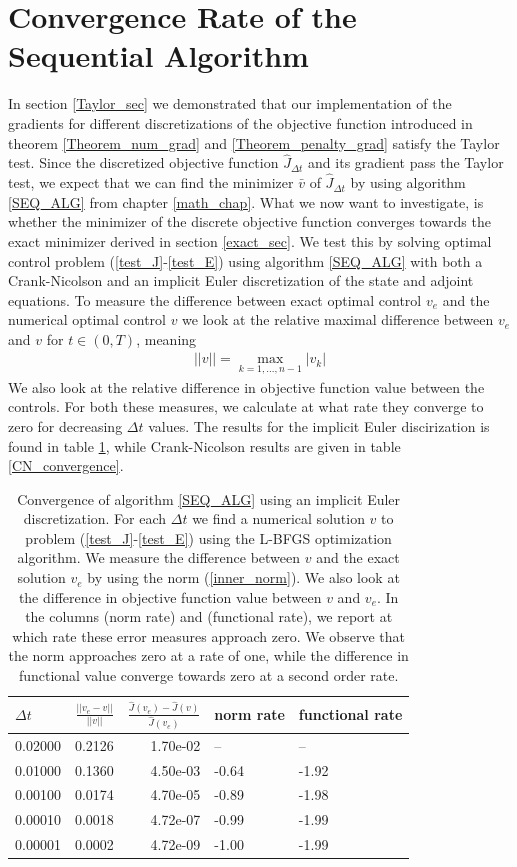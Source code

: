 \section{Convergence Rate of the Sequential Algorithm}
In section \ref{Taylor_sec} we demonstrated that our implementation of the gradients for different discretizations of the objective function introduced in theorem \ref{Theorem_num_grad} and \ref{Theorem_penalty_grad} satisfy the Taylor test. Since the discretized objective function $\hat J_{\Delta t}$ and its gradient pass the Taylor test, we expect that we can find the minimizer $\bar v$ of $\hat J_{\Delta t}$ by using algorithm \ref{SEQ_ALG} from chapter \ref{math_chap}. What we now want to investigate, is whether the minimizer of the discrete objective function converges towards the exact minimizer derived in section \ref{exact_sec}. We test this by solving optimal control problem (\ref{test_J}-\ref{test_E}) using algorithm \ref{SEQ_ALG} with both a Crank-Nicolson and an implicit Euler discretization of the state and adjoint equations. To measure the difference between exact optimal control $v_e$ and the numerical optimal control $v$ we look at the relative maximal difference between $v_e$ and $v$ for $t\in(0,T)$, meaning
\begin{align}
||v|| = \max_{k=1,...,n-1}|v_k| \label{inner_norm}
\end{align} 
We also look at the relative difference in objective function value between the controls. For both these measures, we calculate at what rate they converge to zero for decreasing $\Delta t$ values. The results for the implicit Euler discirization is found in table \ref{IE_convergence}, while Crank-Nicolson results are given in table \ref{CN_convergence}.
\\
\begin{table}[!h]
\caption{Convergence of algorithm \ref{SEQ_ALG} using an implicit Euler discretization. For each $\Delta t$ we find a numerical solution $v$ to problem (\ref{test_J}-\ref{test_E}) using the L-BFGS optimization algorithm. We measure the difference between $v$ and the exact solution $v_e$ by using the norm (\ref{inner_norm}). We also look at the difference in objective function value between $v$ and $v_e$. In the columns (norm rate) and (functional rate), we report at which rate these error measures approach zero. We observe that the norm approaches zero at a rate of one, while the difference in functional value converge towards zero at a second order rate.} \label{IE_convergence}
\centering
\begin{tabular}{lrrll}
\toprule
{} $\Delta t$&    $\frac{||v_e-v||}{||v||}$ &  $\frac{\hat J(v_e)-\hat J(v)}{\hat J(v_e)}$ &   norm rate &    functional rate \\
\midrule
0.02000 &  0.2126 &  1.70e-02 &        -- &       -- \\
0.01000 &  0.1360 &  4.50e-03 & -0.64 & -1.92 \\
0.00100 &  0.0174 &  4.70e-05 & -0.89 & -1.98 \\
0.00010 &  0.0018 &  4.72e-07 &   -0.99 & -1.99 \\
0.00001 &  0.0002 &  4.72e-09 &  -1.00 & -1.99 \\
\bottomrule
\end{tabular}
\end{table}
